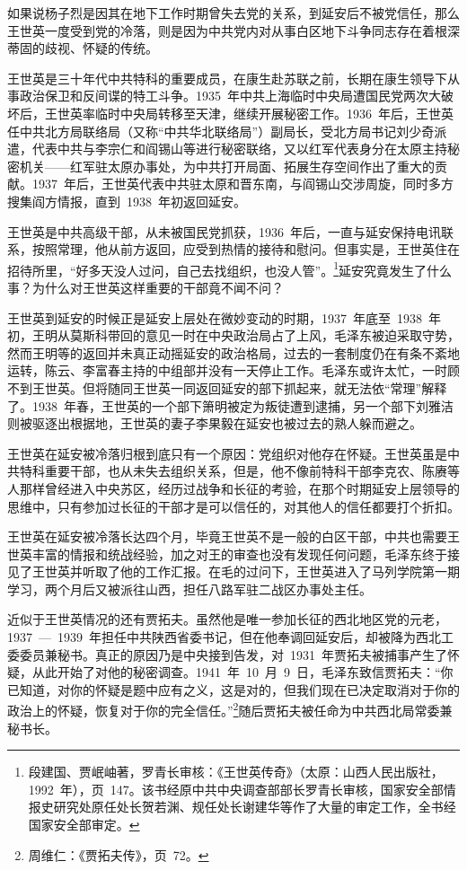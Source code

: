 如果说杨子烈是因其在地下工作时期曾失去党的关系，到延安后不被党信任，那么王世英一度受到党的冷落，则是因为中共党内对从事白区地下斗争同志存在着根深蒂固的歧视、怀疑的传统。

王世英是三十年代中共特科的重要成员，在康生赴苏联之前，长期在康生领导下从事政治保卫和反间谍的特工斗争。1935~年中共上海临时中央局遭国民党两次大破坏后，王世英率临时中央局转移至天津，继续开展秘密工作。1936~年后，王世英任中共北方局联络局（又称“中共华北联络局”）副局长，受北方局书记刘少奇派遣，代表中共与李宗仁和阎锡山等进行秘密联络，又以红军代表身分在太原主持秘密机关——红军驻太原办事处，为中共打开局面、拓展生存空间作出了重大的贡献。1937~年后，王世英代表中共驻太原和晋东南，与阎锡山交涉周旋，同时多方搜集阎方情报，直到~1938~年初返回延安。

王世英是中共高级干部，从未被国民党抓获，1936~年后，一直与延安保持电讯联系，按照常理，他从前方返回，应受到热情的接待和慰问。但事实是，王世英住在招待所里，“好多天没人过问，自己去找组织，也没人管”。\footnote{段建国、贾岷岫著，罗青长审核：《王世英传奇》（太原：山西人民出版社，1992~年），页~147。该书经原中共中央调查部部长罗青长审核，国家安全部情报史研究处原任处长贺若渊、规任处长谢建华等作了大量的审定工作，全书经国家安全部审定。}延安究竟发生了什么事？为什么对王世英这样重要的干部竟不闻不问？

王世英到延安的时候正是延安上层处在微妙变动的时期，1937~年底至~1938~年初，王明从莫斯科带回的意见一时在中央政治局占了上风，毛泽东被迫采取守势，然而王明等的返回并未真正动摇延安的政治格局，过去的一套制度仍在有条不紊地运转，陈云、李富春主持的中组部并没有一天停止工作。毛泽东或许太忙，一时顾不到王世英。但将随同王世英一同返回延安的部下抓起来，就无法依“常理”解释了。1938~年春，王世英的一个部下箫明被定为叛徒遭到逮捕，另一个部下刘雅洁则被驱逐出根据地，王世英的妻子李果毅在延安也被过去的熟人躲而避之。

王世英在延安被冷落归根到底只有一个原因：党组织对他存在怀疑。王世英虽是中共特科重要干部，也从未失去组织关系，但是，他不像前特科干部李克农、陈赓等人那样曾经进入中央苏区，经历过战争和长征的考验，在那个时期延安上层领导的思维中，只有参加过长征的干部才是可以信任的，对其他人的信任都要打个折扣。

王世英在延安被冷落长达四个月，毕竟王世英不是一般的白区干部，中共也需要王世英丰富的情报和统战经验，加之对王的审查也没有发现任何问题，毛泽东终于接见了王世英并听取了他的工作汇报。在毛的过问下，王世英进入了马列学院第一期学习，两个月后又被派往山西，担任八路军驻二战区办事处主任。

近似于王世英情况的还有贾拓夫。虽然他是唯一参加长征的西北地区党的元老，1937~—~1939~年担任中共陕西省委书记，但在他奉调回延安后，却被降为西北工委委员兼秘书。真正的原因乃是中央接到告发，对~1931~年贾拓夫被捕事产生了怀疑，从此开始了对他的秘密调查。1941~年~10~月~9~日，毛泽东致信贾拓夫：“你已知道，对你的怀疑是题中应有之义，这是对的，但我们现在已决定取消对于你的政治上的怀疑，恢复对于你的完全信任。”\footnote{周维仁：《贾拓夫传》，页~72。}随后贾拓夫被任命为中共西北局常委兼秘书长。

